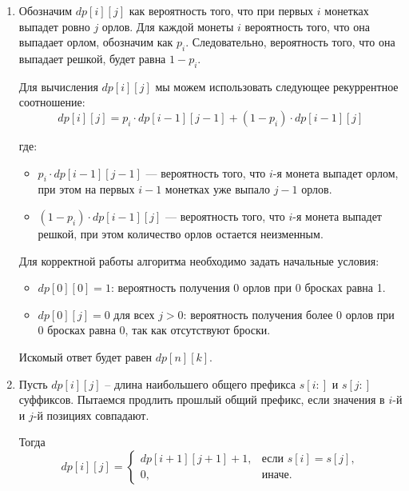 \begin{enumerate}

    \item

    Обозначим \( dp[i][j] \) как вероятность того, что при первых \( i \) монетках выпадет
    ровно \( j \) орлов. Для каждой монеты \( i \) вероятность того, что она выпадает орлом,
    обозначим как \( p_i \). Следовательно, вероятность того, что она выпадает решкой, будет равна \( 1 - p_i \).

    Для вычисления \( dp[i][j] \) мы можем использовать следующее рекуррентное соотношение:
    \[
        dp[i][j] = p_i \cdot dp[i - 1][j - 1] + (1 - p_i) \cdot dp[i - 1][j]
    \]

    где:
    \begin{itemize}

        \item
            \( p_i \cdot dp[i - 1][j - 1] \) — вероятность того, что \( i \)-я монета выпадет орлом,
            при этом на первых \( i-1 \) монетках уже выпало \( j-1 \) орлов.

        \item
            \( (1 - p_i) \cdot dp[i - 1][j] \) — вероятность того, что \( i \)-я монета выпадет решкой,
            при этом количество орлов остается неизменным.

    \end{itemize}

    Для корректной работы алгоритма необходимо задать начальные условия:
    \begin{itemize}
        \item \( dp[0][0] = 1 \): вероятность получения 0 орлов при 0 бросках равна 1.
        \item \( dp[0][j] = 0 \) для всех \( j > 0 \): вероятность получения более 0 орлов при 0 бросках равна 0, так как отсутствуют броски.
    \end{itemize}

    Искомый ответ будет равен \( dp[n][k] \).

    \item

    Пусть $dp[i][j]$ -- длина наибольшего общего префикса $s[i:]$ и $s[j:]$ суффиксов.
    Пытаемся продлить прошлый общий префикс, если значения в $i$-й и $j$-й позициях совпадают.

    Тогда
    \[
        dp[i][j] =
        \begin{cases}
            dp[i + 1][j + 1] + 1, & \text{если } s[i] = s[j], \\
            0, & \text{иначе}.
        \end{cases}
    \]


\end{enumerate}

